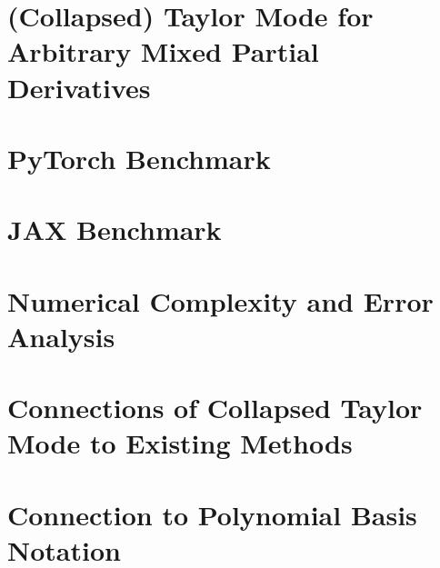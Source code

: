 \documentclass{article}
\begin{document}
\section{(Collapsed) Taylor Mode for Arbitrary Mixed Partial Derivatives}\label{sec:appendix_ttc}


\section{PyTorch Benchmark}
\label{sec:pytorch-benchmark}


\section{JAX Benchmark}
\label{sec:jax-benchmark}


\section{Numerical Complexity and Error Analysis}
\label{sec:numerical-analysis}


\section{Connections of Collapsed Taylor Mode to Existing Methods}
\label{sec:connections}


\section{Connection to Polynomial Basis Notation}
\label{sec:other-notations}

\end{document}
